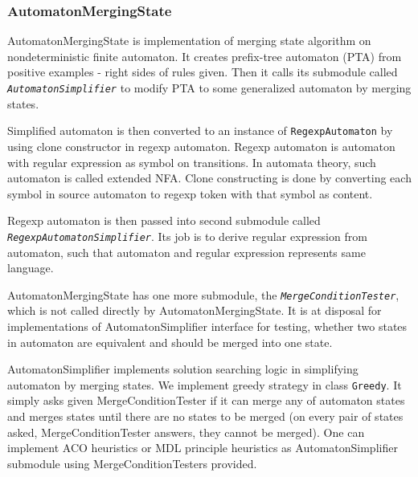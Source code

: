\documentclass[a4paper,10pt,oneside]{article}
\newcommand{\code}[1]{\texttt{#1}}
\newcommand{\jmodule}[1]{\texttt{\textit{#1}}}
\begin{document}
\subsubsection{AutomatonMergingState}
AutomatonMergingState is implementation of merging state algorithm on nondeterministic finite automaton.
It creates prefix-tree automaton (PTA) from positive examples - right sides of rules given.
Then it calls its submodule called \jmodule{AutomatonSimplifier} to  modify PTA to some generalized 
automaton by merging states.

Simplified automaton is then converted to an instance of \code{RegexpAutomaton} by using clone constructor in regexp automaton.
Regexp automaton is automaton with regular expression as symbol on transitions.
In automata theory, such automaton is called extended NFA.
Clone constructing is done by converting each symbol in source automaton to regexp token with that symbol as content.

Regexp automaton is then passed into second submodule called \jmodule{RegexpAutomatonSimplifier}.
Its job is to derive regular expression from automaton, such that automaton and regular expression represents same language.

AutomatonMergingState has one more submodule, the \jmodule{MergeConditionTester}, which is not called directly by AutomatonMergingState.
It is at disposal for implementations of AutomatonSimplifier interface for testing, whether two states in automaton are equivalent and should be merged into one state.

AutomatonSimplifier implements solution searching logic in simplifying automaton by merging states.
We implement greedy strategy in class \code{Greedy}.
It simply asks given MergeConditionTester if it can merge any of automaton states and merges states until there are no states to be merged (on every pair of states asked, MergeConditionTester answers, they cannot be merged).
One can implement ACO heuristics or MDL principle heuristics as AutomatonSimplifier submodule using MergeConditionTesters provided.
\end{document}
